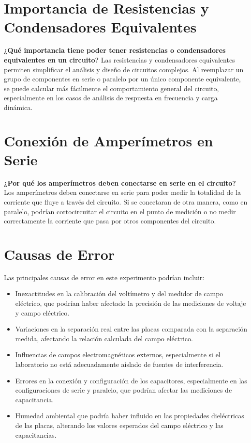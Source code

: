 \section{Importancia de Resistencias y Condensadores Equivalentes}
\textbf{¿Qué importancia tiene poder tener resistencias o condensadores equivalentes en un circuito?}
Las resistencias y condensadores equivalentes permiten simplificar el análisis y diseño de circuitos complejos. Al reemplazar un grupo de componentes en serie o paralelo por un único componente equivalente, se puede calcular más fácilmente el comportamiento general del circuito, especialmente en los casos de análisis de respuesta en frecuencia y carga dinámica.

\section{Conexión de Amperímetros en Serie}
\textbf{¿Por qué los amperímetros deben conectarse en serie en el circuito?}
Los amperímetros deben conectarse en serie para poder medir la totalidad de la corriente que fluye a través del circuito. Si se conectaran de otra manera, como en paralelo, podrían cortocircuitar el circuito en el punto de medición o no medir correctamente la corriente que pasa por otros componentes del circuito.

\section{Causas de Error}
Las principales causas de error en este experimento podrían incluir:
\begin{itemize}
    \item Inexactitudes en la calibración del voltímetro y del medidor de campo eléctrico, que podrían haber afectado la precisión de las mediciones de voltaje y campo eléctrico.
    \item Variaciones en la separación real entre las placas comparada con la separación medida, afectando la relación calculada del campo eléctrico.
    \item Influencias de campos electromagnéticos externos, especialmente si el laboratorio no está adecuadamente aislado de fuentes de interferencia.
    \item Errores en la conexión y configuración de los capacitores, especialmente en las configuraciones de serie y paralelo, que podrían afectar las mediciones de capacitancia.
    \item Humedad ambiental que podría haber influido en las propiedades dieléctricas de las placas, alterando los valores esperados del campo eléctrico y las capacitancias.
\end{itemize}

